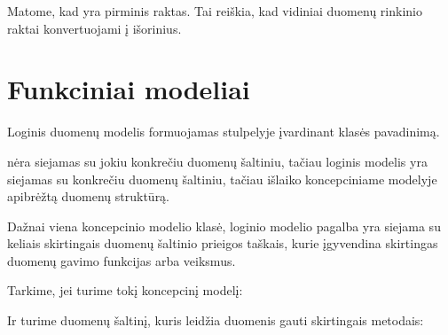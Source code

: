 \documentclass[letterpaper,10pt,lithuanian]{sphinxmanual}
\begin{document}
\sphinxAtStartPar
Matome, kad  yra  pirminis raktas. Tai reiškia, kad
vidiniai duomenų rinkinio raktai konvertuojami į išorinius.

\sphinxstepscope


\section{Funkciniai modeliai}
\label{\detokenize{modeliai/funkciniai:funkciniai-modeliai}}\label{\detokenize{modeliai/funkciniai:functional-models}}\label{\detokenize{modeliai/funkciniai::doc}}
\sphinxAtStartPar
Loginis duomenų modelis formuojamas {\hyperref[\detokenize{formatas:model}]{}} stulpelyje įvardinant
{\hyperref[\detokenize{modelis:uml-index}]{}} klasės pavadinimą.

\sphinxAtStartPar
{\hyperref[\detokenize{modelis:uml-index}]{}} nėra siejamas su jokiu konkrečiu duomenų šaltiniu, tačiau
loginis modelis yra siejamas su konkrečiu duomenų šaltiniu, tačiau išlaiko
koncepciniame modelyje apibrėžtą duomenų struktūrą.

\sphinxAtStartPar
Dažnai viena koncepcinio modelio klasė, loginio modelio pagalba yra siejama su
keliais skirtingais duomenų šaltinio prieigos taškais, kurie įgyvendina
skirtingas duomenų gavimo funkcijas arba veiksmus.

\sphinxAtStartPar
Tarkime, jei turime tokį koncepcinį modelį:

\sphinxAtStartPar
Ir turime duomenų šaltinį, kuris leidžia duomenis gauti skirtingais metodais:
\end{document}
